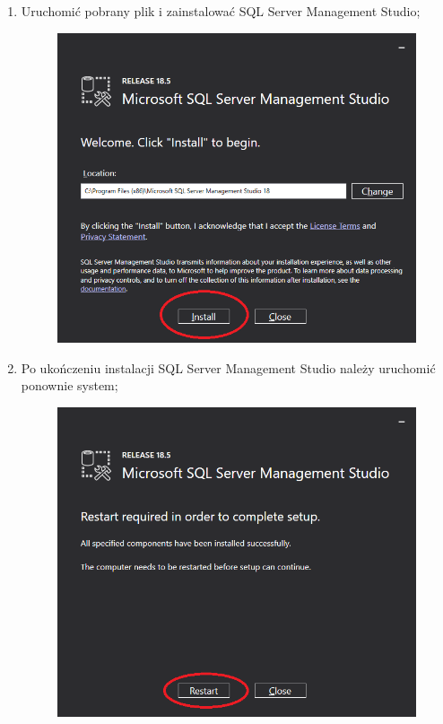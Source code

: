 \documentclass[12pt,a4paper]{article}
\begin{document}
\begin{enumerate}
\begin{figure}[H]
						\centering
					\end{figure}				
				\item Uruchomić pobrany plik i zainstalować SQL Server Management Studio;
					\begin{figure}[H]
						\includegraphics[scale=0.34]{img/Local_Install_6.png}
						\centering
					\end{figure}
				\item Po ukończeniu instalacji SQL Server Management Studio należy uruchomić ponownie system;
					\begin{figure}[H]
						\includegraphics[scale=0.4]{img/Local_Install_7.png}

\end{figure}
\end{enumerate}
\end{document}
